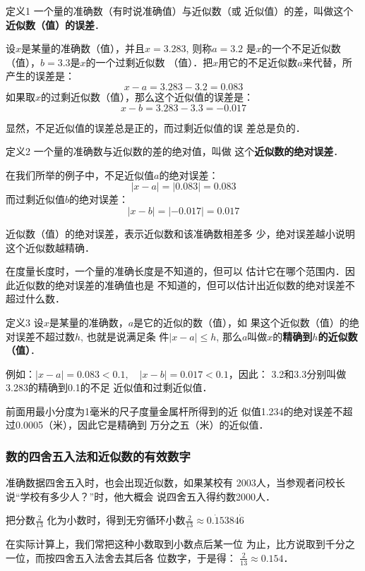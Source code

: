 \begin{blk}{定义1}
    一个量的准确数（有时说准确值）与近似数（或
    近似值）的差，叫做这个\textbf{近似数（值）的误差}．
\end{blk}


设$x$是某量的准确数（值），并且$x=3.283$, 则称$a=3.2$
是$x$的一个不足近似数（值），$b=3.3$是$x$的一个过剩近似数
（值）．把$x$用它的不足近似数$a$来代替，所产生的误差是：
\[x-a=3.283-3.2=0.083\]
如果取$x$的过剩近似数（值），那么这个近似值的误差是：
\[x-b=3.283-3.3=-0.017\]

显然，不足近似值的误差总是正的，而过剩近似值的误
差总是负的．

\begin{blk}{定义2 }
    一个量的准确数与近似数的差的绝对值，叫做
这个\textbf{近似数的绝对误差}．
\end{blk}


在我们所举的例子中，不足近似值$a$的绝对误差：
\[|x-a|=|0.083|=0.083\]
而过剩近似值$b$的绝对误差：
\[|x-b|=|-0.017|=0.017\]

近似数（值）的绝对误差，表示近似数和该准确数相差多
少，绝对误差越小说明这个近似数越精确．

在度量长度时，一个量的准确长度是不知道的，但可以
估计它在哪个范围内．因此近似数的绝对误差的准确值也是
不知道的，但可以估计出近似数的绝对误差不超过什么数．

\begin{blk}{定义3}
    设$x$是某量的准确数，$a$是它的近似的数（值），如
    果这个近似数（值）的绝对误差不超过数$h$, 也就是说满足条
    件$|x-a|\le h$, 那么$a$叫做$x$的\textbf{精确到$h$的近似数（值）}．    
\end{blk}

例如：$|x-a|=0.083<0.1,\quad |x-b|=0.017<0.1$，因此：
3.2和3.3分别叫做3.283的精确到0.1的不足
近似值和过剩近似值．

前面用最小分度为1毫米的尺子度量金属杆所得到的近
似值1.234的绝对误差不超过0.0005（米），因此它是精确到
万分之五（米）的近似值．

\subsubsection{数的四舍五入法和近似数的有效数字}
准确数据四舍五入时，也会出现近似数，如果某校有
2003人，当参观者问校长说“学校有多少人？”时，他大概会
说四舍五入得约数2000人．

把分数$\frac{2}{13}$
化为小数时，得到无穷循环小数$\frac{2}{13}\approx 0.\dot{1}5384\dot{6}$

在实际计算上，我们常把这种小数取到小数点后某一位
为止，比方说取到千分之一位，而按四舍五入法舍去其后各
位数字，于是得：
$\frac{2}{13}\approx 0.154$．

